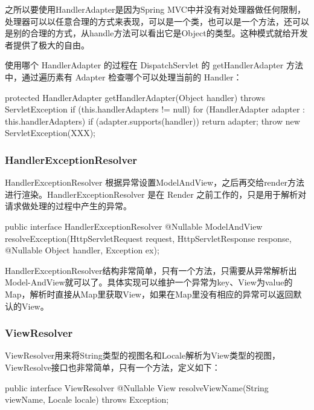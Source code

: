 之所以要使用HandlerAdapter是因为Spring MVC中并没有对处理器做任何限制，处理器可以以任意合理的方式来表现，可以是一个类，也可以是一个方法，还可以是别的合理的方式，从handle方法可以看出它是Object的类型。这种模式就给开发者提供了极大的自由。

使用哪个 HandlerAdapter 的过程在 DispatchServlet 的 getHandlerAdapter 方法中，通过遍历素有 Adapter 检查哪个可以处理当前的 Handler：

\begin{Java}
protected HandlerAdapter getHandlerAdapter(Object handler) throws ServletException {
    if (this.handlerAdapters != null) {
        for (HandlerAdapter adapter : this.handlerAdapters) {
            if (adapter.supports(handler)) {
                return adapter;
            }
        }
    }
    throw new ServletException(XXX);
}
\end{Java}

\subsubsection*{HandlerExceptionResolver}

HandlerExceptionResolver 根据异常设置ModelAndView，之后再交给render方法进行渲染。HandlerExceptionResolver 是在 Render 之前工作的，只是用于解析对请求做处理的过程中产生的异常。

\begin{Java}
public interface HandlerExceptionResolver {
    @Nullable
    ModelAndView resolveException(HttpServletRequest request, HttpServletResponse response, @Nullable Object handler, Exception ex);
}
\end{Java}

HandlerExceptionResolver结构非常简单，只有一个方法，只需要从异常解析出Model-AndView就可以了。具体实现可以维护一个异常为key、View为value的Map，解析时直接从Map里获取View，如果在Map里没有相应的异常可以返回默认的View。

\subsubsection*{ViewResolver}

ViewResolver用来将String类型的视图名和Locale解析为View类型的视图，ViewResolve接口也非常简单，只有一个方法，定义如下：

\begin{Java}
public interface ViewResolver {
    @Nullable
    View resolveViewName(String viewName, Locale locale) throws Exception;
}
\end{Java}

